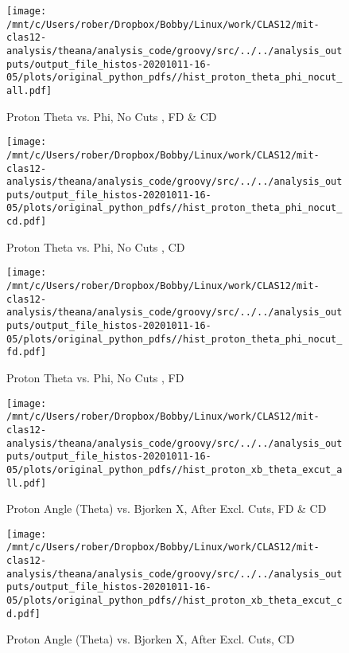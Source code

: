 \documentclass{article}
\begin{document}
\begin{landscape}
    \begin{figure}[h]
        \centering

        \texttt{[image: /mnt/c/Users/rober/Dropbox/Bobby/Linux/work/CLAS12/mit-clas12-analysis/theana/analysis\_code/groovy/src/../../analysis\_outputs/output\_file\_histos-20201011-16-05/plots/original\_python\_pdfs//hist\_proton\_theta\_phi\_nocut\_all.pdf]}
        \captionsetup{textformat=empty,labelformat=blank}
        \caption{Proton Theta vs. Phi, No Cuts , FD \& CD}
    \end{figure}
    \clearpage
    
    \begin{figure}[h]
        \centering

        \texttt{[image: /mnt/c/Users/rober/Dropbox/Bobby/Linux/work/CLAS12/mit-clas12-analysis/theana/analysis\_code/groovy/src/../../analysis\_outputs/output\_file\_histos-20201011-16-05/plots/original\_python\_pdfs//hist\_proton\_theta\_phi\_nocut\_cd.pdf]}
        \captionsetup{textformat=empty,labelformat=blank}
        \caption{Proton Theta vs. Phi, No Cuts , CD}
    \end{figure}
    \clearpage
    
    \begin{figure}[h]
        \centering

        \texttt{[image: /mnt/c/Users/rober/Dropbox/Bobby/Linux/work/CLAS12/mit-clas12-analysis/theana/analysis\_code/groovy/src/../../analysis\_outputs/output\_file\_histos-20201011-16-05/plots/original\_python\_pdfs//hist\_proton\_theta\_phi\_nocut\_fd.pdf]}
        \captionsetup{textformat=empty,labelformat=blank}
        \caption{Proton Theta vs. Phi, No Cuts , FD}
    \end{figure}
    \clearpage
    
    \begin{figure}[h]
        \centering

        \texttt{[image: /mnt/c/Users/rober/Dropbox/Bobby/Linux/work/CLAS12/mit-clas12-analysis/theana/analysis\_code/groovy/src/../../analysis\_outputs/output\_file\_histos-20201011-16-05/plots/original\_python\_pdfs//hist\_proton\_xb\_theta\_excut\_all.pdf]}
        \captionsetup{textformat=empty,labelformat=blank}
        \caption{Proton Angle (Theta) vs. Bjorken X, After Excl. Cuts, FD \& CD}
    \end{figure}
    \clearpage
    
    \begin{figure}[h]
        \centering

        \texttt{[image: /mnt/c/Users/rober/Dropbox/Bobby/Linux/work/CLAS12/mit-clas12-analysis/theana/analysis\_code/groovy/src/../../analysis\_outputs/output\_file\_histos-20201011-16-05/plots/original\_python\_pdfs//hist\_proton\_xb\_theta\_excut\_cd.pdf]}
        \captionsetup{textformat=empty,labelformat=blank}
        \caption{Proton Angle (Theta) vs. Bjorken X, After Excl. Cuts, CD}
    \end{figure}
    \clearpage
    

\end{landscape}
\end{document}

